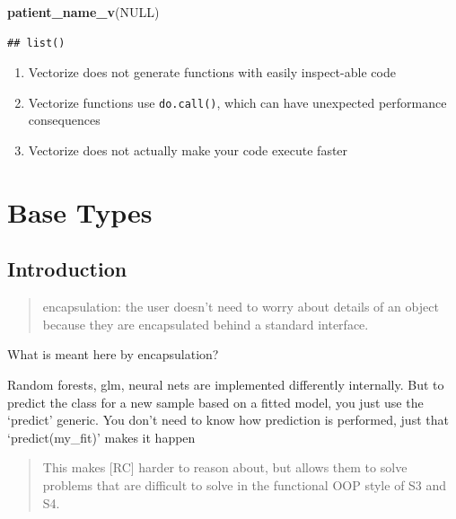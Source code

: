 \documentclass[]{book}
\newenvironment{Shaded}{\begin{snugshade}}{\end{snugshade}}
\newcommand{\KeywordTok}[1]{\textcolor[rgb]{0.13,0.29,0.53}{\textbf{#1}}}
\newcommand{\NormalTok}[1]{#1}
\newcommand{\OtherTok}[1]{\textcolor[rgb]{0.56,0.35,0.01}{#1}}
\providecommand{\tightlist}{%
  \setlength{\itemsep}{0pt}\setlength{\parskip}{0pt}}
\begin{document}
\begin{Shaded}
\begin{Highlighting}[]
\KeywordTok{patient_name_v}\NormalTok{(}\OtherTok{NULL}\NormalTok{)}
\end{Highlighting}
\end{Shaded}

\begin{verbatim}
## list()
\end{verbatim}

\begin{enumerate}
\def\labelenumi{\arabic{enumi}.}
\setcounter{enumi}{1}
\tightlist
\item
  Vectorize does not generate functions with easily inspect-able code
\item
  Vectorize functions use \texttt{do.call()}, which can have unexpected performance consequences
\item
  Vectorize does not actually make your code execute faster
\end{enumerate}

\hypertarget{base-types}{%
\chapter{Base Types}\label{base-types}}

\hypertarget{introduction-2}{%
\section*{Introduction}\label{introduction-2}}

\begin{quote}
encapsulation: the user doesn't need to worry about details of an object because they are encapsulated behind a standard interface.
\end{quote}

What is meant here by encapsulation?

Random forests, glm, neural nets are implemented differently internally. But to predict the class for a new sample based on a fitted model, you just use the `predict' generic. You don't need to know how prediction is performed, just that `predict(my\_fit)' makes it happen

\begin{quote}
This makes {[}RC{]} harder to reason about, but allows them to solve problems that are difficult to solve in the functional OOP style of S3 and S4.
\end{quote}
\end{document}
